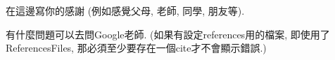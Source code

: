 
在這邊寫你的感謝 (例如感覺父母, 老師, 同學, 朋友等).

有什麼問題可以去問Google\cite{website:google}老師. (如果有設定references用的檔案, 即使用了ReferencesFiles, 那必須至少要存在一個cite才不會顯示錯誤.)

\EndAcknowledgments
